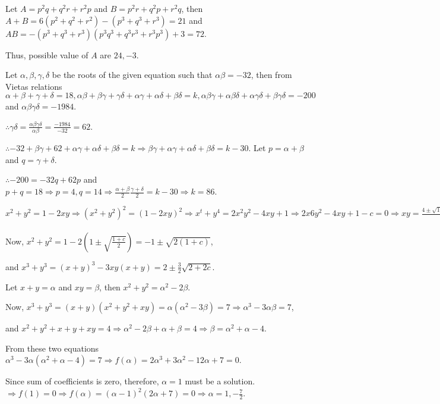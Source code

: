   Let $A = p^2q + q^2r + r^2p$ and $B = p^2r + q^2p + r^2q$, then $A + B = 6(p^2 + q^2 + r^2) - (p^3 + q^3 +
  r^3) = 21$ and $AB = -(p^3 + q^3 + r^3)(p^3q^3 + q^3r^3 + r^3p^3) + 3 = 72$.

  Thus, possible value of $A$ are $24, -3$.
\item Let $\alpha, \beta, \gamma, \delta$ be the roots of the given equation such that $\alpha\beta = -32$,
  then from Vietas relations $\alpha + \beta + \gamma + \delta = 18, \alpha\beta + \beta\gamma +
  \gamma\delta + \alpha\gamma + \alpha\delta + \beta\delta = k, \alpha\beta\gamma + \alpha\beta\delta +
  \alpha\gamma\delta + \beta\gamma\delta = -200$ and $\alpha\beta\gamma\delta = -1984$.

  $\therefore \gamma\delta = \frac{\alpha\beta\gamma\delta}{\alpha\beta} = \frac{-1984}{-32} = 62$.

  $\therefore -32 + \beta\gamma + 62 + \alpha\gamma + \alpha\delta + \beta\delta = k \Rightarrow \beta\gamma
  + \alpha\gamma + \alpha\delta + \beta\delta = k - 30$. Let $p = \alpha + \beta$ and $q = \gamma + \delta$.

  $\therefore -200 = -32q + 62p$ and $p + q = 18 \Rightarrow p = 4, q = 14\Rightarrow \frac{\alpha +
    \beta}{2}\frac{\gamma + \delta}{2} = k - 30 \Rightarrow k = 86$.
\item $x^2 + y^2 = 1 - 2xy \Rightarrow (x^2 + y^2)^2 = (1 - 2xy)^2 \Rightarrow x^t + y^4 = 2x^2y^2 - 4xy + 1
  \Rightarrow 2x6y^2 - 4xy + 1 - c = 0 \Rightarrow xy = \frac{4 \pm\sqrt{16 + 8c - 8}}{4} =
  1\pm\sqrt{\frac{1 + c}{2}}$

  Now, $x^2 + y^2 = 1 - 2\left(1\pm\sqrt{\frac{1 + c}{2}}\right) = -1\pm \sqrt{2(1 + c)}$,

  and $x^3 + y^3 = (x + y)^3 - 3xy(x + y) = 2\pm\frac{3}{2}\sqrt{2 + 2c}$.
\item Let $x + y = \alpha$ and $xy = \beta$, then $x^2 + y^2 = \alpha^2 - 2\beta$.

  Now, $x^3 + y^3 = (x + y)(x^2 + y^2 + xy) = \alpha(\alpha^2 - 3\beta) = 7\Rightarrow \alpha^3 -
  3\alpha\beta = 7$,

  and $x^2 + y^2 + x + y + xy = 4 \Rightarrow \alpha^2 - 2\beta + \alpha + \beta = 4 \Rightarrow \beta =
  \alpha^2 + \alpha - 4$.

  From these two equations $\alpha^3 - 3\alpha(\alpha^2 + \alpha - 4) = 7\Rightarrow f(\alpha) = 2\alpha^3 +
  3\alpha^2 - 12\alpha + 7 = 0$.

  Since sum of coefficients is zero, therefore, $\alpha = 1$ must be a solution. $\Rightarrow f(1) = 0
  \Rightarrow f(\alpha) = (\alpha - 1)^2(2\alpha + 7) = 0 \Rightarrow \alpha = 1, -\frac{7}{2}$.

